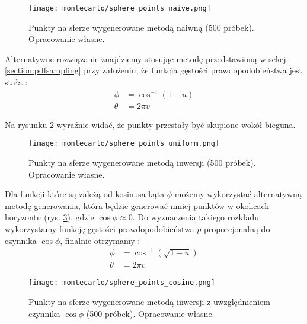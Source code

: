 \documentclass[../main.tex]{subfiles}
\begin{document}
\begin{figure}[h]
    \centering
    \texttt{[image: montecarlo/sphere\_points\_naive.png]}
    \caption{Punkty na sferze wygenerowane metodą naiwną (500 próbek). Opracowanie własne.}
    \label{fig:SpherePointsNaive}
\end{figure}

Alternatywne rozwiązanie znajdziemy stosując metodę przedstawioną w sekcji \ref{section:pdfsampling}  przy założeniu, że funkcja gęstości prawdopodobieństwa jest stała \cite{dammertz_2012, AdvancedCGRenderingEq}:
\begin{equation}	
\begin{aligned}
	\phi &= \cos^{-1}(1-u) \\
	\theta &= 2 \pi v
\end{aligned}
\end{equation}

Na rysunku \ref{fig:SpherePointsUniform} wyraźnie widać, że punkty przestały być skupione wokół bieguna.

\begin{figure}[h]
    \centering
    \texttt{[image: montecarlo/sphere\_points\_uniform.png]}
    \caption{Punkty na sferze wygenerowane metodą inwersji (500 próbek). Opracowanie własne.}
    \label{fig:SpherePointsUniform}
\end{figure}

Dla funkcji które są zależą od kosinusa kąta $\phi$ możemy wykorzystać alternatywną metodę generowania, która będzie generować mniej punktów w okolicach horyzontu (rys. \ref{fig:SpherePointsCosine}), gdzie $\cos\phi \approx 0$. Do wyznaczenia takiego rozkładu wykorzystamy funkcję gęstości prawdopodobieństwa $p$ proporcjonalną do czynnika $\cos \phi$, finalnie otrzymamy \cite{AdvancedCGRenderingEq}:
\begin{equation}	
\begin{aligned}
  \phi &= \cos^{-1}(\sqrt{1-u}) \\
  \theta &= 2 \pi v
\end{aligned}
\end{equation}

\begin{figure}[h]
    \centering
    \texttt{[image: montecarlo/sphere\_points\_cosine.png]}
    \caption{Punkty na sferze wygenerowane metodą inwersji z uwzględnieniem czynnika $\cos\phi$ (500 próbek). Opracowanie własne.}
    \label{fig:SpherePointsCosine}
\end{figure}
\end{document}
